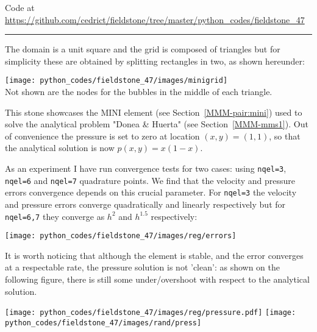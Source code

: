 

\begin{center}
Code at \url{https://github.com/cedrict/fieldstone/tree/master/python_codes/fieldstone_47}
\end{center}

\par\noindent\rule{\textwidth}{0.4pt}

The domain is a unit square and the grid is composed of triangles but for simplicity these 
are obtained by splitting rectangles in two, as shown hereunder:

\begin{center}
\texttt{[image: python\_codes/fieldstone\_47/images/minigrid]}\\
Not shown are the nodes for the bubbles in the middle of each triangle. 
\end{center}

This stone showcases the MINI element (see Section~\ref{MMM-pair:mini})
used to solve the analytical problem "Donea \& Huerta" (see Section~\ref{MMM-mms1}).
Out of convenience the pressure is set to zero at location $(x,y)=(1,1)$, so that the 
analytical solution is now $p(x,y)=x(1-x)$. 

As an experiment I have run convergence tests for two cases: using {\tt nqel=3},  
{\tt nqel=6} and {\tt nqel=7} quadrature points.
We find that the velocity and pressure errors convergence depends on this crucial parameter. 
For {\tt nqel=3} the velocity and pressure errors converge quadratically and linearly respectively
but for {\tt nqel=6,7} they converge as $h^2$ and $h^{1.5}$ respectively:

\begin{center}
\texttt{[image: python\_codes/fieldstone\_47/images/reg/errors]}
\end{center}

It is worth noticing that although the element is stable, and the error converges
at a respectable rate, the pressure solution is not 'clean': as shown on the 
following figure, there is still some under/overshoot with respect to the analytical solution.

\begin{center}
\texttt{[image: python\_codes/fieldstone\_47/images/reg/pressure.pdf]}
\texttt{[image: python\_codes/fieldstone\_47/images/rand/press]}
\end{center}

